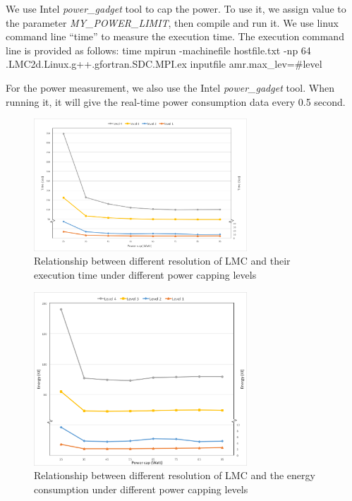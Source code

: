 We use Intel \textit{power\_gadget} tool to cap the power. To use it, we assign value to the parameter \textit{MY\_POWER\_LIMIT}, then compile and run it.
We use linux command line ``time'' to measure the execution time. The execution command line is provided as follows:
time mpirun -machinefile hostfile.txt -np 64 .\/LMC2d.Linux.g++.gfortran.SDC.MPI.ex inputfile amr.max\_lev=\#level

For the power measurement, we also use the Intel \textit{power\_gadget} tool. When running it, it will give the real-time power consumption data every 0.5 second.



\noindent
\begin{figure}[H]
	\centering
    \includegraphics[width=8cm]{figs/CAPER_lev1-4_power_cap_time_edited.png}
        \caption{Relationship between different resolution of LMC and their execution time under different power capping levels}
        \label{fig:RAPLpowercaptime}
\end{figure}

\begin{figure}[H]
	\centering
    \includegraphics[width=8cm]{figs/CAPER_lev1-4_power_cap_energy_edited.png}
        \caption{Relationship between different resolution of LMC and the energy consumption under different power capping levels}
        \label{fig:RAPLpowercappower}
\end{figure}

